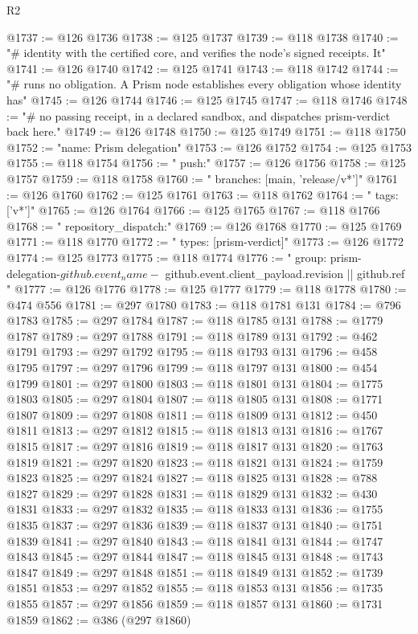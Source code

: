 \begin{lexlean}{R2}
\begin{coremodule}
@1737 := @126 @1736
@1738 := @125 @1737
@1739 := @118 @1738
@1740 := "# identity with the certified core, and verifies the node's signed receipts. It"
@1741 := @126 @1740
@1742 := @125 @1741
@1743 := @118 @1742
@1744 := "# runs no obligation. A Prism node establishes every obligation whose identity has"
@1745 := @126 @1744
@1746 := @125 @1745
@1747 := @118 @1746
@1748 := "# no passing receipt, in a declared sandbox, and dispatches prism-verdict back here."
@1749 := @126 @1748
@1750 := @125 @1749
@1751 := @118 @1750
@1752 := "name: Prism delegation"
@1753 := @126 @1752
@1754 := @125 @1753
@1755 := @118 @1754
@1756 := "  push:"
@1757 := @126 @1756
@1758 := @125 @1757
@1759 := @118 @1758
@1760 := "    branches: [main, 'release/v*']"
@1761 := @126 @1760
@1762 := @125 @1761
@1763 := @118 @1762
@1764 := "    tags: ['v*']"
@1765 := @126 @1764
@1766 := @125 @1765
@1767 := @118 @1766
@1768 := "  repository_dispatch:"
@1769 := @126 @1768
@1770 := @125 @1769
@1771 := @118 @1770
@1772 := "    types: [prism-verdict]"
@1773 := @126 @1772
@1774 := @125 @1773
@1775 := @118 @1774
@1776 := "  group: prism-delegation-${{ github.event_name }}-${{ github.event.client_payload.revision || github.ref }}"
@1777 := @126 @1776
@1778 := @125 @1777
@1779 := @118 @1778
@1780 := @474 @556
@1781 := @297 @1780
@1783 := @118 @1781 @131
@1784 := @796 @1783
@1785 := @297 @1784
@1787 := @118 @1785 @131
@1788 := @1779 @1787
@1789 := @297 @1788
@1791 := @118 @1789 @131
@1792 := @462 @1791
@1793 := @297 @1792
@1795 := @118 @1793 @131
@1796 := @458 @1795
@1797 := @297 @1796
@1799 := @118 @1797 @131
@1800 := @454 @1799
@1801 := @297 @1800
@1803 := @118 @1801 @131
@1804 := @1775 @1803
@1805 := @297 @1804
@1807 := @118 @1805 @131
@1808 := @1771 @1807
@1809 := @297 @1808
@1811 := @118 @1809 @131
@1812 := @450 @1811
@1813 := @297 @1812
@1815 := @118 @1813 @131
@1816 := @1767 @1815
@1817 := @297 @1816
@1819 := @118 @1817 @131
@1820 := @1763 @1819
@1821 := @297 @1820
@1823 := @118 @1821 @131
@1824 := @1759 @1823
@1825 := @297 @1824
@1827 := @118 @1825 @131
@1828 := @788 @1827
@1829 := @297 @1828
@1831 := @118 @1829 @131
@1832 := @430 @1831
@1833 := @297 @1832
@1835 := @118 @1833 @131
@1836 := @1755 @1835
@1837 := @297 @1836
@1839 := @118 @1837 @131
@1840 := @1751 @1839
@1841 := @297 @1840
@1843 := @118 @1841 @131
@1844 := @1747 @1843
@1845 := @297 @1844
@1847 := @118 @1845 @131
@1848 := @1743 @1847
@1849 := @297 @1848
@1851 := @118 @1849 @131
@1852 := @1739 @1851
@1853 := @297 @1852
@1855 := @118 @1853 @131
@1856 := @1735 @1855
@1857 := @297 @1856
@1859 := @118 @1857 @131
@1860 := @1731 @1859
@1862 := @386 (@297 @1860)

\end{coremodule}
\end{lexlean}
